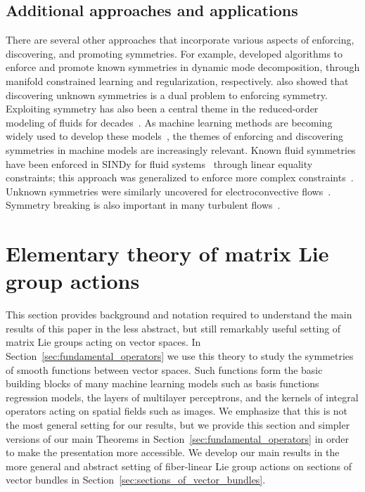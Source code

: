 \documentclass[twoside,11pt]{article}
\begin{document}
\subsection{Additional approaches and applications}
There are several other approaches that incorporate various aspects of enforcing, discovering, and promoting symmetries. For example, \cite{baddoo2023physics} developed algorithms to enforce and promote known symmetries in dynamic mode decomposition, through manifold constrained learning and regularization, respectively.  \cite{baddoo2023physics} also showed that discovering unknown symmetries is a dual problem to enforcing symmetry.   
%
Exploiting symmetry has also been a central theme in the reduced-order modeling of fluids for decades~\citep{HLBR_turb}. As machine learning methods are becoming widely used to develop these models~\citep{Brunton2020arfm}, the themes of enforcing and discovering symmetries in machine models are increasingly relevant.  Known fluid symmetries have been enforced in SINDy for fluid systems~\citep{Loiseau2017jfm} through linear equality constraints; this approach was generalized to enforce more complex constraints~\citep{champion2020unified}. Unknown symmetries were similarly uncovered for electroconvective flows~\citep{guan2020sparse}. Symmetry breaking is also important in many turbulent flows~\citep{Callaham2022scienceadvances}. 



\section{Elementary theory of matrix Lie group actions}
\label{sec:background_on_matrix_Lie_groups}
This section provides background and notation required to understand the main results of this paper in the less abstract, but still remarkably useful setting of matrix Lie groups acting on vector spaces.
In Section~\ref{sec:fundamental_operators} we use this theory to study the symmetries of smooth functions between vector spaces.
Such functions form the basic building blocks of many machine learning models such as basis functions regression models, the layers of multilayer perceptrons, and the kernels of integral operators acting on spatial fields such as images.
We emphasize that this is not the most general setting for our results, but we provide this section and simpler versions of our main Theorems in Section~\ref{sec:fundamental_operators} in order to make the presentation more accessible.
We develop our main results in the more general and abstract setting of fiber-linear Lie group actions on sections of vector bundles in Section~\ref{sec:sections_of_vector_bundles}.
\end{document}

